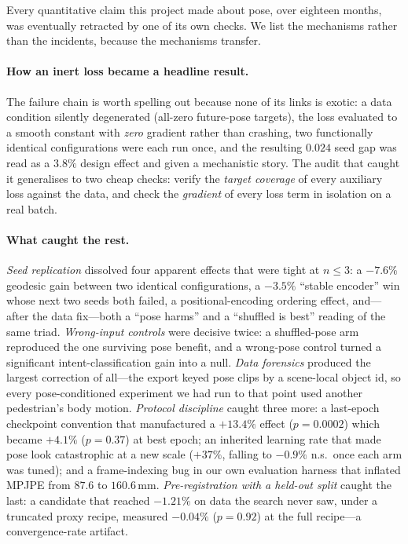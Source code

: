 \documentclass{article} %
\begin{document}
Every quantitative claim this project made about pose, over eighteen months, was
eventually retracted by one of its own checks. We list the mechanisms rather than
the incidents, because the mechanisms transfer.

\paragraph{How an inert loss became a headline result.}
The failure chain is worth spelling out because none of its links is exotic: a
data condition silently degenerated (all-zero future-pose targets), the loss
evaluated to a smooth constant with \emph{zero} gradient rather than crashing, two
functionally identical configurations were each run once, and the resulting
$0.024$ seed gap was read as a $3.8\%$ design effect and given a mechanistic
story. The audit that caught it generalises to two cheap checks: verify the
\emph{target coverage} of every auxiliary loss against the data, and check the
\emph{gradient} of every loss term in isolation on a real batch.

\paragraph{What caught the rest.}
\emph{Seed replication} dissolved four apparent effects that were tight at
$n{\leq}3$: a $-7.6\%$ geodesic gain between two identical configurations, a
$-3.5\%$ ``stable encoder'' win whose next two seeds both failed, a
positional-encoding ordering effect, and---after the data fix---both a
``pose harms'' and a ``shuffled is best'' reading of the same triad.
\emph{Wrong-input controls} were decisive twice: a shuffled-pose arm reproduced
the one surviving pose benefit, and a wrong-pose control turned a significant
intent-classification gain into a null. \emph{Data forensics} produced the largest
correction of all---the export keyed pose clips by a scene-local object id, so
every pose-conditioned experiment we had run to that point used another
pedestrian's body motion. \emph{Protocol discipline} caught three more: a
last-epoch checkpoint convention that manufactured a $+13.4\%$ effect
($p{=}0.0002$) which became $+4.1\%$ ($p{=}0.37$) at best epoch; an inherited
learning rate that made pose look catastrophic at a new scale ($+37\%$, falling
to $-0.9\%$ n.s.\ once each arm was tuned); and a frame-indexing bug in our own
evaluation harness that inflated MPJPE from $87.6$ to $160.6$\,mm.
\emph{Pre-registration with a held-out split} caught the last: a candidate that
reached $-1.21\%$ on data the search never saw, under a truncated proxy recipe,
measured $-0.04\%$ ($p{=}0.92$) at the full recipe---a convergence-rate artifact.
\end{document}
